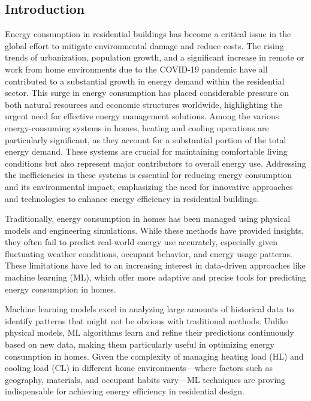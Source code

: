 \documentclass[a4paper, 12pt]{article}
\begin{document}
\subsection{Introduction}
\quad Energy consumption in residential buildings has become a critical issue in the global effort to mitigate environmental damage and reduce costs. The rising trends of urbanization, population growth, and a significant increase in remote or work from home environments due to the COVID-19 pandemic have all contributed to a substantial growth in energy demand within the residential sector. This surge in energy consumption has placed considerable pressure on both natural resources and economic structures worldwide, highlighting the urgent need for effective energy management solutions. Among the various energy-consuming systems in homes, heating and cooling operations are particularly significant, as they account for a substantial portion of the total energy demand. These systems are crucial for maintaining comfortable living conditions but also represent major contributors to overall energy use. Addressing the inefficiencies in these systems is essential for reducing energy consumption and its environmental impact, emphasizing the need for innovative approaches and technologies to enhance energy efficiency in residential buildings.
\vspace{7pt}

\quad Traditionally, energy consumption in homes has been managed using physical models and engineering simulations. While these methods have provided insights, they often fail to predict real-world energy use accurately, especially given fluctuating weather conditions, occupant behavior, and energy usage patterns. These limitations have led to an increasing interest in data-driven approaches like machine learning (ML), which offer more adaptive and precise tools for predicting energy consumption in homes.
\vspace{7pt}

\quad Machine learning models excel in analyzing large amounts of historical data to identify patterns that might not be obvious with traditional methods. Unlike physical models, ML algorithms learn and refine their predictions continuously based on new data, making them particularly useful in optimizing energy consumption in homes. Given the complexity of managing heating load (HL) and cooling load (CL) in different home environments—where factors such as geography, materials, and occupant habits vary—ML techniques are proving indispensable for achieving energy efficiency in residential design.
\vspace{7pt}
\end{document}
